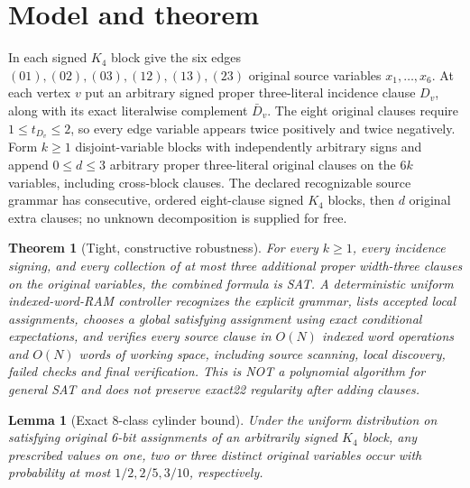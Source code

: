 \documentclass[10pt]{article}
\newtheorem{theorem}{Theorem}
\newtheorem{lemma}{Lemma}
\begin{document}
\section{Model and theorem}
In each signed $K_4$ block give the six edges $(01),(02),(03),(12),(13),(23)$ original source variables $x_1,\ldots,x_6$. At each vertex $v$ put an arbitrary signed proper three-literal incidence clause $D_v$, along with its exact literalwise complement $\bar D_v$. The eight original clauses require $1\le t_{D_v}\le2$, so every edge variable appears twice positively and twice negatively. Form $k\ge1$ disjoint-variable blocks with independently arbitrary signs and append $0\le d\le3$ arbitrary proper three-literal original clauses on the $6k$ variables, including cross-block clauses. The declared recognizable source grammar has consecutive, ordered eight-clause signed $K_4$ blocks, then $d$ original extra clauses; no unknown decomposition is supplied for free.
\begin{theorem}[Tight, constructive robustness]
For \emph{every} $k\ge1$, every incidence signing, and \emph{every} collection of at most three additional proper width-three clauses on the original variables, the combined formula is SAT. A deterministic uniform indexed-word-RAM controller recognizes the explicit grammar, lists accepted local assignments, chooses a global satisfying assignment using exact conditional expectations, and verifies every source clause in $O(N)$ indexed word operations and $O(N)$ words of working space, including source scanning, local discovery, failed checks and final verification. This is NOT a polynomial algorithm for general SAT and does not preserve exact22 regularity after adding clauses.
\end{theorem}
\begin{lemma}[Exact 8-class cylinder bound]
Under the uniform distribution on satisfying original 6-bit assignments of an arbitrarily signed $K_4$ block, any prescribed values on one, two or three distinct original variables occur with probability at most $1/2,2/5,3/10$, respectively.
\end{lemma}
\end{document}
